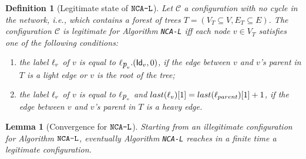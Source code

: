 \documentclass[11pt,a4paper]{article}
\newtheorem{definition}{Definition}
\newtheorem{lemma}{Lemma}
\newcommand{\id}{\mbox{\sf Id}}
\newcommand{\parent}{\mbox{\it p}}
\newcommand{\lab}{\mbox{\rm $\ell$}}
\newcommand{\LabA}{\mbox{\tt NCA-L}}
\begin{document}
\begin{definition}[Legitimate state of $\LabA$]
\label{def:label_legitimate_configuration}
Let $\mathcal{C}$ a configuration with no cycle in the network, i.e., which contains a forest of trees $T=(V_T \subseteq V,E_T \subseteq E)$. The configuration $\mathcal{C}$ is legitimate for Algorithm \LabA\/ iff each node $v \in V_T$ satisfies one of the following conditions:
\begin{enumerate}
\item the label $\lab_v$ of $v$ is equal to $\lab_{\parent_v}.(\id_v,0)$, if the edge between $v$ and $v$'s parent in $T$ is a light edge or $v$ is the root of the tree;
\item the label $\lab_v$ of $v$ is equal to $\lab_{\parent_v}$ and $last(\lab_v)[1]=last(\lab_{parent})[1]+1$, if the edge between $v$ and $v$'s parent in $T$ is a heavy edge.
\end{enumerate}
\end{definition}

\begin{lemma}[Convergence for $\LabA$]
\label{lem:label_convergence}
Starting from an illegitimate configuration for Algorithm $\LabA$, eventually Algorithm \LabA\/ reaches in a finite time a legitimate configuration.
\end{lemma}
\end{document}
